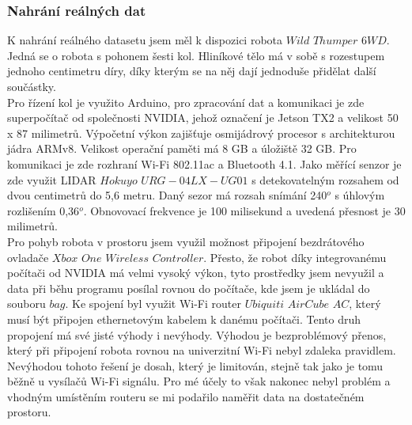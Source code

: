 \documentclass[12pt]{article}
\begin{document}
\subsubsection{Nahrání reálných dat}
K nahrání reálného datasetu jsem měl k dispozici robota $Wild$ $Thumper$ $6WD$. Jedná se o robota s pohonem šesti kol. Hliníkové tělo má v sobě s rozestupem jednoho centimetru díry, díky kterým se na něj dají jednoduše přidělat další součástky. \\
\indent Pro řízení kol je využito Arduino, pro zpracování dat a komunikaci je zde superpočítač od společnosti NVIDIA, jehož označení je Jetson TX2 a velikost 50 x 87 milimetrů. Výpočetní výkon zajišťuje osmijádrový procesor s architekturou jádra ARMv8. Velikost operační paměti má 8 GB a úložiště 32 GB. Pro komunikaci je zde rozhraní Wi-Fi 802.11ac a Bluetooth 4.1. Jako měřící senzor je zde využit LIDAR $Hokuyo$ $URG-04LX-UG01$ s detekovatelným rozsahem od dvou centimetrů do 5,6 metru. Daný sezor má rozsah snímání 240$^o$ s úhlovým rozlišením 0,36$^o$. Obnovovací frekvence je 100 milisekund a uvedená přesnost je 30 milimetrů.\\
\indent Pro pohyb robota v prostoru jsem využil možnost připojení bezdrátového ovladače $Xbox$ $One$ $Wireless$ $Controller$. Přesto, že robot díky integrovanému počítači od NVIDIA má velmi vysoký výkon, tyto prostředky jsem nevyužil a data při běhu programu posílal rovnou do počítače, kde jsem je ukládal do souboru $bag$. Ke spojení byl využit Wi-Fi router $Ubiquiti$ $AirCube$ $AC$, který musí být připojen ethernetovým kabelem k danému počítači. Tento druh propojení má své jisté výhody i nevýhody. Výhodou je bezproblémový přenos, který při připojení robota rovnou na univerzitní Wi-Fi nebyl zdaleka pravidlem. Nevýhodou tohoto řešení je dosah, který je limitován, stejně tak jako je tomu běžně u vysílačů Wi-Fi signálu. Pro mé účely to však nakonec nebyl problém a vhodným umístěním routeru se mi podařilo naměřit data na dostatečném prostoru. 
\end{document}
